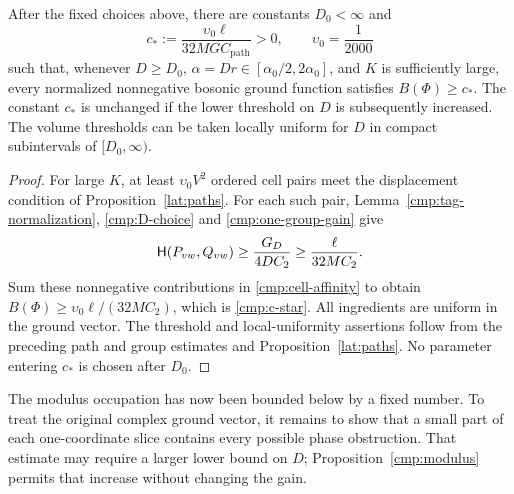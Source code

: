 \begin{proposition}\label{cmp:modulus}
After the fixed choices above, there are constants $D_0<\infty$ and
\begin{equation}\label{cmp:c-star}
 c_*:=\frac{\upsilon_0\ell}{32M G C_{\mathrm{path}}}>0,
 \qquad \upsilon_0=\frac1{2000}
\end{equation}
such that, whenever $D\ge D_0$, $\alpha=Dr\in[\alpha_0/2,2\alpha_0]$,
and $K$ is sufficiently large, every normalized nonnegative bosonic ground
function satisfies $B(\Phi)\ge c_*$. The constant $c_*$ is unchanged if
the lower threshold on $D$ is subsequently increased. The volume thresholds
can be taken locally uniform for $D$ in compact subintervals of
$[D_0,\infty)$.
\end{proposition}
\begin{proof}
For large $K$, at least $\upsilon_0V^2$ ordered cell pairs meet the displacement
condition of Proposition~\ref{lat:paths}. For each such pair,
Lemma~\ref{cmp:tag-normalization}, \eqref{cmp:D-choice} and
\eqref{cmp:one-group-gain} give
\[
 \mathsf H(P_{vw},Q_{vw})
 \ge\frac{G_D}{4D C_2}
 \ge\frac\ell{32M C_2}.
\]
Sum these nonnegative contributions in \eqref{cmp:cell-affinity} to obtain
$B(\Phi)\ge\upsilon_0\ell/(32M C_2)$, which is \eqref{cmp:c-star}.
All ingredients are uniform in the ground vector. The threshold and
local-uniformity assertions follow from the preceding path and group
estimates and Proposition~\ref{lat:paths}. No parameter entering $c_*$ is
chosen after $D_0$.
\end{proof}

The modulus occupation has now been bounded below by a fixed number. To
treat the original complex ground vector, it remains to show that a small
part of each one-coordinate slice contains every possible phase obstruction.
That estimate may require a larger lower bound on $D$; Proposition~\ref{cmp:modulus}
permits that increase without changing the gain.
